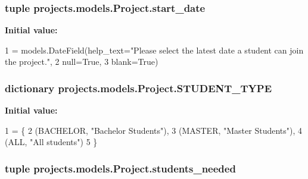\hypertarget{classprojects_1_1models_1_1_project_ae7c2fba1b45662e8ff60977fbe3df5d8}{
\subsubsection[{start\-\_\-date}]{\setlength{\rightskip}{0pt plus 5cm}tuple projects.\-models.\-Project.\-start\-\_\-date\hspace{0.3cm}{\ttfamily [static]}}}\label{classprojects_1_1models_1_1_project_ae7c2fba1b45662e8ff60977fbe3df5d8}
{\bfseries Initial value\-:}
\begin{DoxyCode}
1 = models.DateField(help\_text=\textcolor{stringliteral}{"Please select the latest date a student can join the project."},
2                                   null=\textcolor{keyword}{True},
3                                   blank=\textcolor{keyword}{True})
\end{DoxyCode}
\hypertarget{classprojects_1_1models_1_1_project_ac3f6c8d9f7ebc77cb51c414beb0da1ff}{
\subsubsection[{S\-T\-U\-D\-E\-N\-T\-\_\-\-T\-Y\-P\-E}]{\setlength{\rightskip}{0pt plus 5cm}dictionary projects.\-models.\-Project.\-S\-T\-U\-D\-E\-N\-T\-\_\-\-T\-Y\-P\-E\hspace{0.3cm}{\ttfamily [static]}}}\label{classprojects_1_1models_1_1_project_ac3f6c8d9f7ebc77cb51c414beb0da1ff}
{\bfseries Initial value\-:}
\begin{DoxyCode}
1 = \{
2         (BACHELOR, \textcolor{stringliteral}{"Bachelor Students"}),
3         (MASTER, \textcolor{stringliteral}{"Master Students"}),
4         (ALL, \textcolor{stringliteral}{"All students"})
5     \}
\end{DoxyCode}
\hypertarget{classprojects_1_1models_1_1_project_a520a39ed8efd4fef0a9fda1f3ea1aea3}{
\subsubsection[{students\-\_\-needed}]{\setlength{\rightskip}{0pt plus 5cm}tuple projects.\-models.\-Project.\-students\-\_\-needed\hspace{0.3cm}{\ttfamily [static]}}}\label{classprojects_1_1models_1_1_project_a520a39ed8efd4fef0a9fda1f3ea1aea3}
